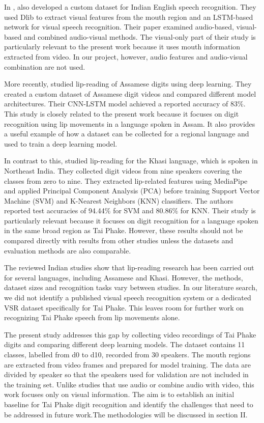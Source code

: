 \documentclass[journal]{IEEEtran}
\begin{document}
In \cite{indian2024audiovisual}, also developed a custom dataset for Indian English speech recognition. They used Dlib to extract visual features from the mouth region and an LSTM-based network for visual speech recognition. Their paper examined audio-based, visual-based and combined audio-visual methods. The visual-only part of their study is particularly relevant to the present work because it uses mouth information extracted from video. In our project, however, audio features and audio-visual combination are not used.

More recently, \cite{prasad2025analysis} studied lip-reading of Assamese digits using deep learning. They created a custom dataset of Assamese digit videos and compared different model architectures. Their CNN-LSTM model achieved a reported accuracy of 83\%. This study is closely related to the present work because it focuses on digit recognition using lip movements in a language spoken in Assam. It also provides a useful example of how a dataset can be collected for a regional language and used to train a deep learning model.

In contrast to this, \cite{lyngdoh2026khasi} studied lip-reading for the Khasi language, which is spoken in Northeast India. They collected digit videos from nine speakers covering the classes from zero to nine. They extracted lip-related features using MediaPipe and applied Principal Component Analysis (PCA) before training Support Vector Machine (SVM) and K-Nearest Neighbors (KNN) classifiers. The authors reported test accuracies of 94.44\% for SVM and 80.86\% for KNN. Their study is particularly relevant because it focuses on digit recognition for a language spoken in the same broad region as Tai Phake. However, these results should not be compared directly with results from other studies unless the datasets and evaluation methods are also comparable.

The reviewed Indian studies show that lip-reading research has been carried out for several languages, including Assamese and Khasi. However, the methods, dataset sizes and recognition tasks vary between studies. In our literature search, we did not identify a published visual speech recognition system or a dedicated VSR dataset specifically for Tai Phake. This leaves room for further work on recognizing Tai Phake speech from lip movements alone.

The present study addresses this gap by collecting video recordings of Tai Phake digits and comparing different deep learning models. The dataset contains 11 classes, labelled from d0 to d10, recorded from 30 speakers. The mouth regions are extracted from video frames and prepared for model training. The data are divided by speaker so that the speakers used for validation are not included in the training set. Unlike studies that use audio or combine audio with video, this work focuses only on visual information. The aim is to establish an initial baseline for Tai Phake digit recognition and identify the challenges that need to be addressed in future work.The methodologies will be discussed in section II.
\end{document}
